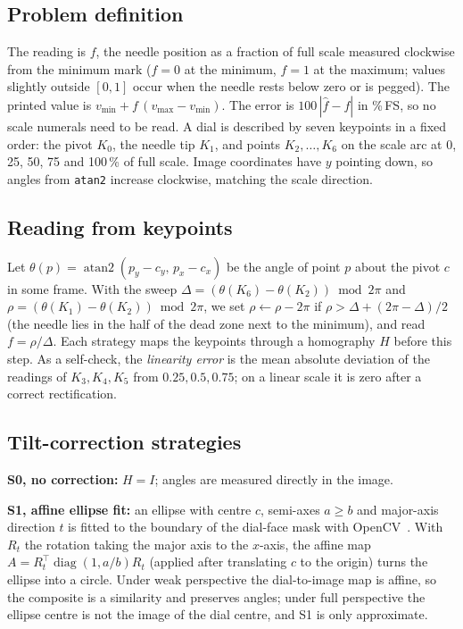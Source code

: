 \documentclass[conference]{IEEEtran}
\begin{document}
\subsection{Problem definition}
The reading is $f$, the needle position as a fraction of full scale measured clockwise from the minimum mark
($f=0$ at the minimum, $f=1$ at the maximum; values slightly outside $[0,1]$ occur when the needle rests below
zero or is pegged). The printed value is $v_{\min} + f\,(v_{\max}-v_{\min})$. The error is
$100\,|\hat f - f|$ in \%\,FS, so no scale numerals need to be read. A dial is described by seven keypoints in a
fixed order: the pivot $K_0$, the needle tip $K_1$, and points $K_2,\dots,K_6$ on the scale arc at 0, 25, 50, 75
and 100\,\% of full scale. Image coordinates have $y$ pointing down, so angles from \texttt{atan2} increase
clockwise, matching the scale direction.

\subsection{Reading from keypoints}
Let $\theta(p)=\operatorname{atan2}(p_y-c_y,\,p_x-c_x)$ be the angle of point $p$ about the pivot $c$ in some
frame. With the sweep $\Delta=(\theta(K_6)-\theta(K_2)) \bmod 2\pi$ and $\rho=(\theta(K_1)-\theta(K_2)) \bmod 2\pi$,
we set $\rho \leftarrow \rho - 2\pi$ if $\rho > \Delta + (2\pi-\Delta)/2$ (the needle lies in the half of the
dead zone next to the minimum), and read $f=\rho/\Delta$. Each strategy maps the keypoints through a homography
$H$ before this step. As a self-check, the \emph{linearity error} is the mean absolute deviation of the readings
of $K_3,K_4,K_5$ from $0.25, 0.5, 0.75$; on a linear scale it is zero after a correct rectification.

\subsection{Tilt-correction strategies}
\textbf{S0, no correction:} $H=I$; angles are measured directly in the image.

\textbf{S1, affine ellipse fit:} an ellipse with centre $c$, semi-axes $a\ge b$ and major-axis direction $t$ is
fitted to the boundary of the dial-face mask with OpenCV~\cite{bradski2000}. With $R_t$ the rotation taking the
major axis to the $x$-axis, the affine map $A=R_t^{\top}\operatorname{diag}(1,a/b)R_t$ (applied after translating
$c$ to the origin) turns the ellipse into a circle. Under weak perspective the dial-to-image map is affine, so
the composite is a similarity and preserves angles; under full perspective the ellipse centre is not the image
of the dial centre, and S1 is only approximate.
\end{document}
